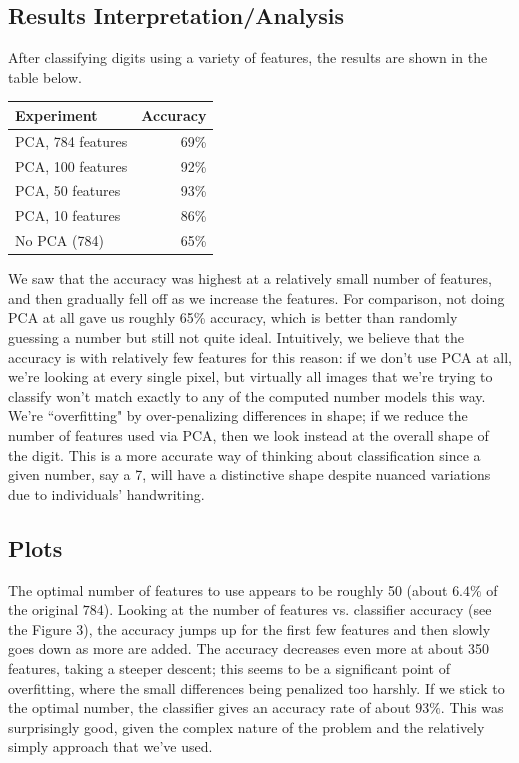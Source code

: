 \documentclass[twocolumn]{article}
\begin{document}
\subsection{Results Interpretation/Analysis}
\label{subsec:interpretation}

After classifying digits using a variety of features, the results are shown in the table below.

\begin{center}
    \begin{tabular}{| l | r |}
        \hline
        \textbf{Experiment} & \textbf{Accuracy} \\ \hline
        PCA, 784 features & 69\% \\ \hline
        PCA, 100 features & 92\% \\ \hline
        PCA, 50 features & 93\% \\ \hline
        PCA, 10 features & 86\% \\ \hline
        No PCA (784) & 65\% \\ \hline
    \end{tabular}
\end{center}

We saw that the accuracy was highest at a relatively small number of features, and then gradually fell off as we increase the features. For comparison, not doing PCA at all gave us roughly 65\% accuracy, which is better than randomly guessing a number but still not quite ideal. Intuitively, we believe that the accuracy is with relatively few features for this reason: if we don't use PCA at all, we're looking at every single pixel, but virtually all images that we're trying to classify won't match exactly to any of the computed number models this way. We're ``overfitting" by over-penalizing differences in shape; if we reduce the number of features used via PCA, then we look instead at the overall shape of the digit. This is a more accurate way of thinking about classification since a given number, say a 7, will have a distinctive shape despite nuanced variations due to individuals' handwriting. 

\subsection{Plots}
\label{subsec:plots}

The optimal number of features to use appears to be roughly 50 (about $6.4\%$ of the original $784$). Looking at the number of features vs. classifier accuracy (see the Figure 3), the accuracy jumps up for the first few features and then slowly goes down as more are added. The accuracy decreases even more at about 350 features, taking a steeper descent; this seems to be a significant point of overfitting, where the small differences being penalized too harshly. If we stick to the optimal number, the classifier gives an accuracy rate of about $93\%$. This was surprisingly good, given the complex nature of the problem and the relatively simply approach that we've used. 
\end{document}

